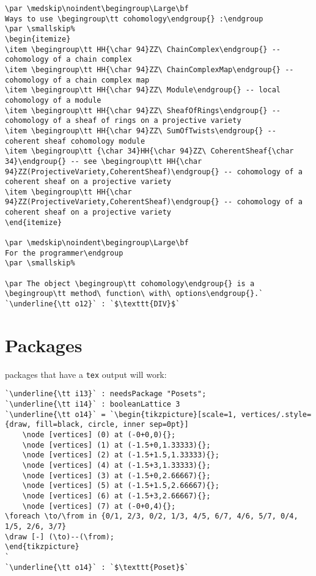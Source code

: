 \documentclass[12pt,a4paper]{amsart}
\begin{document}
\begin{lstlisting}[language=Macaulay2output]
\par \medskip\noindent\begingroup\Large\bf
Ways to use \begingroup\tt cohomology\endgroup{} :\endgroup
\par \smallskip%
\begin{itemize}
\item \begingroup\tt HH{\char 94}ZZ\ ChainComplex\endgroup{} -- cohomology of a chain complex
\item \begingroup\tt HH{\char 94}ZZ\ ChainComplexMap\endgroup{} -- cohomology of a chain complex map
\item \begingroup\tt HH{\char 94}ZZ\ Module\endgroup{} -- local cohomology of a module
\item \begingroup\tt HH{\char 94}ZZ\ SheafOfRings\endgroup{} -- cohomology of a sheaf of rings on a projective variety
\item \begingroup\tt HH{\char 94}ZZ\ SumOfTwists\endgroup{} -- coherent sheaf cohomology module
\item \begingroup\tt {\char 34}HH{\char 94}ZZ\ CoherentSheaf{\char 34}\endgroup{} -- see \begingroup\tt HH{\char 94}ZZ(ProjectiveVariety,CoherentSheaf)\endgroup{} -- cohomology of a coherent sheaf on a projective variety
\item \begingroup\tt HH{\char 94}ZZ(ProjectiveVariety,CoherentSheaf)\endgroup{} -- cohomology of a coherent sheaf on a projective variety
\end{itemize}

\par \medskip\noindent\begingroup\Large\bf
For the programmer\endgroup
\par \smallskip%

\par The object \begingroup\tt cohomology\endgroup{} is a \begingroup\tt method\ function\ with\ options\endgroup{}.`
`\underline{\tt o12}` : `$\texttt{DIV}$`
\end{lstlisting}

\section{Packages}
packages that have a {\tt tex} output will work:
\begin{lstlisting}[language=Macaulay2output]
`\underline{\tt i13}` : needsPackage "Posets";
`\underline{\tt i14}` : booleanLattice 3
`\underline{\tt o14}` = `\begin{tikzpicture}[scale=1, vertices/.style={draw, fill=black, circle, inner sep=0pt}]
	\node [vertices] (0) at (-0+0,0){};
	\node [vertices] (1) at (-1.5+0,1.33333){};
	\node [vertices] (2) at (-1.5+1.5,1.33333){};
	\node [vertices] (4) at (-1.5+3,1.33333){};
	\node [vertices] (3) at (-1.5+0,2.66667){};
	\node [vertices] (5) at (-1.5+1.5,2.66667){};
	\node [vertices] (6) at (-1.5+3,2.66667){};
	\node [vertices] (7) at (-0+0,4){};
\foreach \to/\from in {0/1, 2/3, 0/2, 1/3, 4/5, 6/7, 4/6, 5/7, 0/4, 1/5, 2/6, 3/7}
\draw [-] (\to)--(\from);
\end{tikzpicture}
`
`\underline{\tt o14}` : `$\texttt{Poset}$`
\end{lstlisting}
\end{document}
